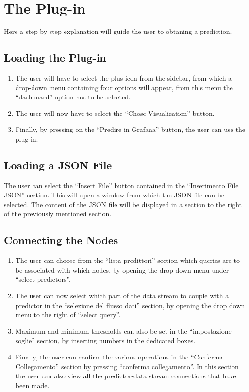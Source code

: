 \section{The Plug-in}
Here a step by step explanation will guide the user to obtaning a prediction.

\subsection{Loading the Plug-in}
\begin{enumerate}
	\item The user will have to select the plus icon from the sidebar, from which a drop-down menu containing four options will appear, from this menu the “dashboard” option has to be selected.
	\item The user will now have to select the “Chose Visualization” button.
	\item Finally, by pressing on the “Predire in Grafana” button, the user can use the plug-in.
\end{enumerate}
	
\subsection{Loading a JSON File}
The user can select the “Insert File” button contained in the “Inserimento File JSON” section.
This will open a window from which the JSON file can be selected.
The content of the JSON file will be displayed in a section to the right of the previously mentioned section.


\subsection{Connecting the Nodes}
\begin{enumerate}
	\item The user can choose from the “lista predittori” section which queries are to be associated with which nodes, by opening the drop down menu under “select predictors”.
	\item The user can now select which part of the data stream to couple with a predictor in the “selezione del flusso dati” section, by opening the drop down menu to the right of “select query”.
	\item Maximum and minimum thresholds can also be set in the “impostazione soglie” section, by inserting numbers in the dedicated boxes.
	\item Finally, the user can confirm the various operations in the “Conferma Collegamento” section by pressing “conferma collegamento”. In this section the user can also view all the predictor-data stream connections that have been made.
\end{enumerate}

